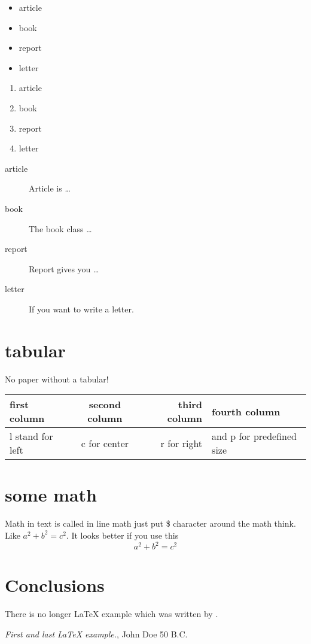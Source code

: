 \documentclass[12pt, a4paper, twoside, titlepage]{article}
\begin{document}
\begin{itemize}
\item article
\item book
\item report
\item letter
\end{itemize}


\begin{enumerate}
\item article
\item book
\item report
\item letter
\end{enumerate}

\begin{description}
\item[article\label{article}]{Article is \ldots}
\item[book\label{book}]{The book class \ldots}
\item[report\label{report}]{Report gives you \ldots}
\item[letter\label{letter}]{If you want to write a letter.}
\end{description}

\section{tabular}
No paper without a tabular!

\begin{tabular}{|l|c|r|p{2cm}|}
\hline
first column & second column & third column & fourth column \\
\hline
l stand for left & c for center & r for right & and p for predefined size \\
\hline
\end{tabular}


\section{some math}
Math in text is called in line math just put \$ character around
the math think. Like $ a^2 + b^2 = c^2 $. It looks better if you use
this
\[a^2 + b^2 = c^2\]

\section{Conclusions}\label{conclusions}
There is no longer \LaTeX{} example which was written by \cite{doe}.

\begin{thebibliography}{9}
 \emph{First and last \LaTeX{} example.},
John Doe 50 B.C.
\end{thebibliography}
\end{document}
